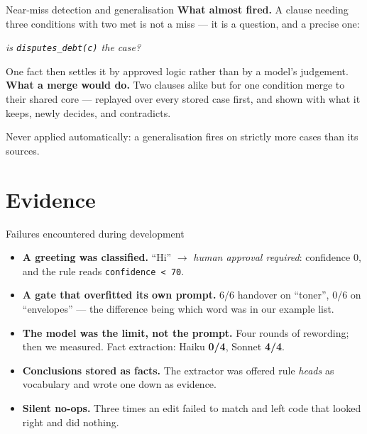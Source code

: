\documentclass[aspectratio=169,11pt]{beamer}
\begin{document}
\begin{frame}{Near-miss detection and generalisation}
  \vspace{1.1em}
  \textbf{\color{petrol}What almost fired.}
  A clause needing three conditions with two met is not a miss --- it is a
  question, and a precise one:
  \begin{center}\emph{is \texttt{disputes\_debt(c)} the case?}\end{center}
  {\color{muted}\small One fact then settles it by approved logic rather than by
  a model's judgement.}
  \vspace{1.3em}
  \pause
  \textbf{\color{petrol}What a merge would do.}
  Two clauses alike but for one condition merge to their shared core --- replayed
  over every stored case first, and shown with what it keeps, newly decides, and
  contradicts.
  \begin{center}\color{muted}\small
    Never applied automatically: a generalisation fires on strictly more cases
    than its sources.
  \end{center}
\end{frame}

\section{Evidence}

\begin{frame}{Failures encountered during development}
  \vspace{.7em}
  \begin{itemize}\setlength\itemsep{.6em}
    \item \textbf{A greeting was classified.} ``Hi'' $\rightarrow$ \emph{human
      approval required}: confidence 0, and the rule reads
      \texttt{confidence < 70}.
    \item \textbf{A gate that overfitted its own prompt.} 6/6 handover on
      ``toner'', 0/6 on ``envelopes'' --- the difference being which word was in
      our example list.
    \item \textbf{The model was the limit, not the prompt.} Four rounds of
      rewording; then we measured. Fact extraction: Haiku \textbf{0/4}, Sonnet
      \textbf{4/4}.
    \item \textbf{Conclusions stored as facts.} The extractor was offered rule
      \emph{heads} as vocabulary and wrote one down as evidence.
    \item \textbf{Silent no-ops.} Three times an edit failed to match and left
      code that looked right and did nothing.
  \end{itemize}
\end{frame}
\end{document}
